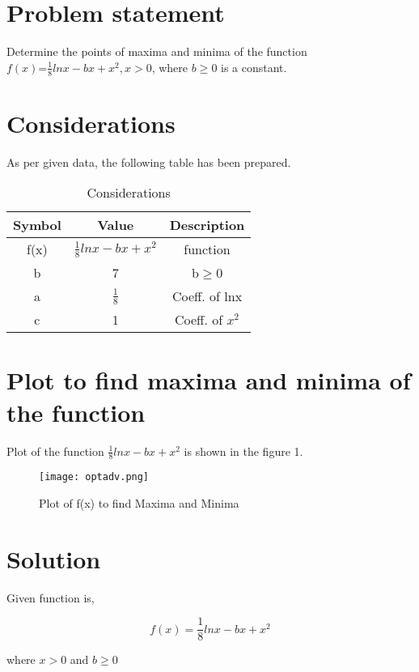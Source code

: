 \documentclass[journal,10pt,twocolumn]{article}
\begin{document}
\section{Problem statement}
\begin{flushleft}
Determine the points of maxima and minima of the function\\
\vspace{0.25cm}
$f(x)$=$\frac{1}{8}lnx-bx+x^2, x>0$, where $b\geq0$ is a constant.
\end{flushleft}

\section{Considerations}
\vspace{0.2cm}
\begin{flushleft}
As per given data, the following table has been prepared.\\
\end{flushleft}
\vspace{0.3cm}
\begin{table}[htbp]
    \centering
\setlength\extrarowheight{2pt}
\begin{tabular}{|c|c|c|} \hline
      \textbf{Symbol}           &   \textbf{Value}   & \textbf{Description}\\ \hline
	f(x) & $\frac{1}{8}lnx-bx+x^2$ & function\\  \hline
	b & 7 & b$\geq0$\\ \hline
	a & $\frac{1}{8}$ & Coeff. of lnx\\ \hline
    c & 1 & Coeff. of $x^2$ \\ \hline

\end{tabular}
\caption{\label{tab:widgets}Considerations}
\end{table}

\section{Plot to find maxima and minima of the function}
\vspace{0.25cm}
Plot of the function $\frac{1}{8}lnx-bx+x^2$ is shown in the figure 1.
\begin{figure}[h]
\texttt{[image: optadv.png]}
\caption{Plot of f(x) to find Maxima and Minima}
\label{Optimization of Machince A and B}
\end{figure}

\section{Solution}
\begin{flushleft}
Given function is,\\
\end{flushleft}
\begin{equation}
    f(x)=\frac{1}{8}lnx-bx+x^2
\end{equation}
\begin{center}
where $x>0$ and $b\geq0$
\end{center}
\end{document}

